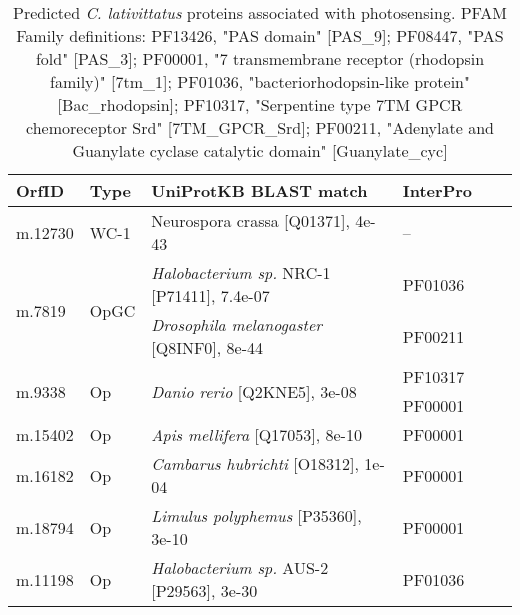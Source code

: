 \begin{table}[tbp]
\caption[\textit{C. lativittatus} photosensing proteins]{Predicted \textit{C. lativittatus} proteins associated with photosensing. PFAM Family definitions: PF13426, "PAS domain" [PAS\_9]; PF08447, "PAS fold" [PAS\_3]; PF00001, "7 transmembrane receptor (rhodopsin family)" [7tm\_1]; PF01036, "bacteriorhodopsin-like protein" [Bac\_rhodopsin]; PF10317, "Serpentine type 7TM GPCR chemoreceptor Srd" [7TM\_GPCR\_Srd]; PF00211, "Adenylate and Guanylate cyclase catalytic domain" [Guanylate\_cyc]} 
\label{tab:ChClat_photosensing}
\begin{tabular}{lllllr}
  \hline
OrfID & Type & UniProtKB BLAST match & InterPro \\ 
  \hline
m.12730 & WC-1 & Neurospora crassa [Q01371], 4e-43 & -- \\ 
  \multirow{2}{*}{m.7819} & \multirow{2}{*}{OpGC} & \emph{Halobacterium sp.} NRC-1 [P71411], 7.4e-07 & PF01036 \\
  & & \emph{Drosophila melanogaster} [Q8INF0], 8e-44 & PF00211 \\ 
  \multirow{2}{*}{m.9338} & \multirow{2}{*}{Op} & \multirow{2}{*}{\emph{Danio rerio} [Q2KNE5], 3e-08} & PF10317 \\
  & & & PF00001 \\
  m.15402 & Op & \emph{Apis mellifera} [Q17053], 8e-10 & PF00001 \\
  m.16182 & Op & \emph{Cambarus hubrichti} [O18312], 1e-04 & PF00001 \\
  m.18794 & Op & \emph{Limulus polyphemus} [P35360], 3e-10 & PF00001 \\
  m.11198 & Op & \emph{Halobacterium sp.} AUS-2 [P29563], 3e-30 & PF01036 \\
   \hline
\end{tabular}
\end{table}
